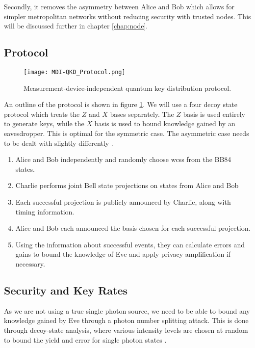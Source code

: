 Secondly, it removes the asymmetry between Alice and Bob which allows for simpler metropolitan networks without reducing security with trusted nodes. This will be discussed further in chapter \ref{chap:node}.

\subsection{Protocol}

\begin{figure}[tbp]
	\centering
	\texttt{[image: MDI-QKD\_Protocol.png]}
	\caption[MDI-QKD protocol]{Measurement-device-independent quantum key distribution protocol.}
	\label{fig:mdi_protocol}
\end{figure}

An outline of the protocol is shown in figure \ref{fig:mdi_protocol}. We will use a four decoy state protocol \cite{zhou2016} which treats the $Z$ and $X$ bases separately. The $Z$ basis is used entirely to generate keys, while the $X$ basis is used to bound knowledge gained by an eavesdropper. This is optimal for the symmetric case. The asymmetric case needs to be dealt with slightly differently \cite{wang2018}.

\begin{enumerate}
	\item {} Alice and Bob independently and randomly choose \acp{wcs} from the BB84 states. 
	\item {} Charlie performs joint Bell state projections on states from Alice and Bob
	\item {} Each successful projection is publicly announced by Charlie, along with timing information.
	\item {} Alice and Bob each announced the basis chosen for each successful projection.
	\item {} Using the information about successful events, they can calculate errors and gains to bound the knowledge of Eve and apply privacy amplification if necessary.
\end{enumerate}

\subsection{Security and Key Rates}

As we are not using a true single photon source, we need to be able to bound any knowledge gained by Eve through a photon number splitting attack. This is done through decoy-state analysis, where various intensity levels are chosen at random to bound the yield and error for single photon states \cite{Lo2005}. 

